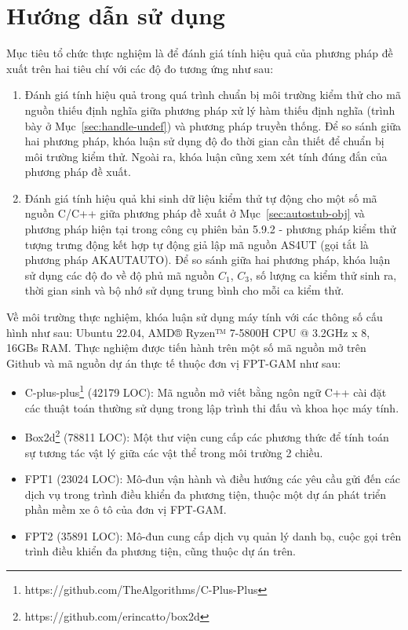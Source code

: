 \section{Hướng dẫn sử dụng}\label{sec:manual}
Mục tiêu tổ chức thực nghiệm là để đánh giá tính hiệu quả của phương pháp đề xuất trên hai tiêu chí với các độ đo tương ứng như sau:
\begin{enumerate}
    \item Đánh giá tính hiệu quả trong quá trình chuẩn bị môi trường kiểm thử cho mã nguồn thiếu định nghĩa giữa phương pháp xử lý hàm thiếu định nghĩa (trình bày ở Mục~\ref{sec:handle-undef}) và phương pháp truyền thống. Để so sánh giữa hai phương pháp, khóa luận sử dụng độ đo thời gian cần thiết để chuẩn bị môi trường kiểm thử. Ngoài ra, khóa luận cũng xem xét tính đúng đắn của phương pháp đề xuất.
    \item Đánh giá tính hiệu quả khi sinh dữ liệu kiểm thử tự động cho một số mã nguồn C/C++ giữa phương pháp đề xuất ở Mục~\ref{sec:autostub-obj} và phương pháp hiện tại trong công cụ phiên bản 5.9.2 - phương pháp kiểm thử tượng trưng động kết hợp tự động giả lập mã nguồn AS4UT (gọi tắt là phương pháp AKAUTAUTO). Để so sánh giữa hai phương pháp, khóa luận sử dụng các độ đo về độ phủ mã nguồn $C_1$, $C_3$, số lượng ca kiểm thử sinh ra, thời gian sinh và bộ nhớ sử dụng trung bình cho mỗi ca kiểm thử.
\end{enumerate}

Về môi trường thực nghiệm, khóa luận sử dụng máy tính với các thông số cấu hình như sau: Ubuntu 22.04, AMD® Ryzen™ 7-5800H CPU @ 3.2GHz x 8, 16GBs RAM. Thực nghiệm được tiến hành trên một số mã nguồn mở trên Github và mã nguồn dự án thực tế thuộc đơn vị FPT-GAM như sau:
\begin{itemize}
    \item C-plus-plus\footnote{https://github.com/TheAlgorithms/C-Plus-Plus} (42179 LOC): Mã nguồn mở viết bằng ngôn ngữ C++ cài đặt các thuật toán thường sử dụng trong lập trình thi đấu và khoa học máy tính.
    \item Box2d\footnote{https://github.com/erincatto/box2d} (78811 LOC): Một thư viện cung cấp các phương thức để tính toán sự tương tác vật lý giữa các vật thể trong môi trường 2 chiều.
    \item FPT1 (23024 LOC): Mô-đun vận hành và điều hướng các yêu cầu gửi đến các dịch vụ trong trình điều khiển đa phương tiện, thuộc một dự án phát triển phần mềm xe ô tô của đơn vị FPT-GAM.
    \item FPT2 (35891 LOC): Mô-đun cung cấp dịch vụ quản lý danh bạ, cuộc gọi trên trình điều khiển đa phương tiện, cũng thuộc dự án trên.
\end{itemize}

